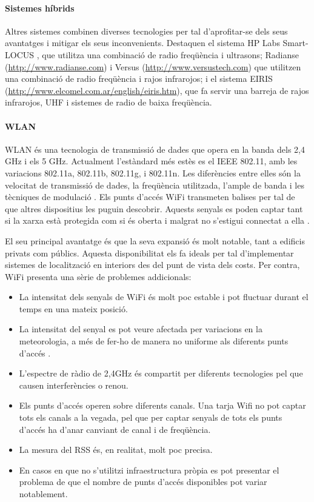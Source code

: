 \paragraph{Sistemes híbrids}

Altres sistemes combinen diverses tecnologies per tal d'aprofitar-se dels seus avantatges i mitigar els seus inconvenients. Destaquen el sistema HP Labs Smart-LOCUS \cite{oconnor}, que utilitza una combinació de radio freqüència i ultrasons; Radianse (\url{http://www.radianse.com}) i Versus (\url{http://www.versustech.com}) que utilitzen una combinació de radio freqüència i rajos infrarojos; i el sistema EIRIS (\url{http://www.elcomel.com.ar/english/eiris.htm}), que fa servir una barreja de rajos infrarojos, UHF i sistemes de radio de baixa freqüència.

\paragraph{WLAN}

WLAN és una tecnologia de transmissió de dades que opera en la banda dels 2,4 GHz i els 5 GHz. Actualment l'estàndard més estès es el IEEE 802.11, amb les variacions 802.11a, 802.11b, 802.11g, i 802.11n. Les diferències entre elles són la velocitat de transmissió de dades, la freqüència utilitzada, l’ample de banda i les tècniques de modulació \cite{chan}. Els punts d’accés WiFi transmeten balises per tal de que altres dispositius les puguin descobrir. Aquests senyals es poden captar tant si la xarxa està protegida com si és oberta i malgrat no s’estigui connectat a ella \cite{vilaseca}.

El seu principal avantatge és que la seva expansió és molt notable, tant a edificis privats com públics. Aquesta disponibilitat els fa ideals per tal d'implementar sistemes de localització en interiors des del punt de vista dels costs. Per contra, WiFi presenta una sèrie de problemes addicionals:

\begin{itemize}

    \item La intensitat dels senyals de WiFi és molt poc estable i pot fluctuar durant el temps en una mateix posició.
    \item La intensitat del senyal es pot veure afectada per variacions en la meteorologia, a més de fer-ho de manera no uniforme als diferents punts d'accés \cite{crane}.
    \item L'espectre de ràdio de 2,4GHz és compartit per diferents tecnologies pel que causen interferències o renou.
    \item Els punts d'accés operen sobre diferents canals. Una tarja Wifi no pot captar tots els canals a la vegada, pel que per captar senyals de tots els punts d'accés ha d'anar canviant de canal i de freqüència.
    \item La mesura del RSS és, en realitat, molt poc precisa.
    \item En casos en que no s’utilitzi infraestructura pròpia es pot presentar el problema de que el nombre de punts d'accés disponibles pot variar notablement.

\end{itemize}

